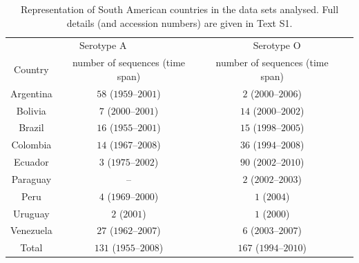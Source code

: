 \documentclass[a4paper,10pt]{article}
\begin{document}
\begin{table}[H]
 \caption{
 Representation of South American countries in the data sets analysed.
 Full details (and accession numbers) are given in Text S1.
 }
 \begin{tabular}{cccc}
 \toprule
   \multicolumn{2}{c}{Serotype A}& \multicolumn{2}{c}{Serotype O}\\
 Country & number of sequences (time span)& number of sequences (time span) & \\ 
  \midrule
Argentina & $58$ ($1959$--$2001$)& $2$ ($2000$--$2006$)  \\
Bolivia   & $7$ ($2000$--$2001$)& $14$ ($2000$--$2002$)  \\
Brazil    & $16$ ($1955$--$2001$)& $15$ ($1998$--$2005$)  \\
Colombia  & $14$ ($1967$--$2008$)& $36$ ($1994$--$2008$)  \\
Ecuador   & $3$ ($1975$--$2002$)& $90$ ($2002$--$2010$)  \\
Paraguay                    & --& $2$ ($2002$--$2003$)  \\
Peru      & $4$ ($1969$--$2000$)& $1$ ($2004$)  \\
Uruguay   & $2$ ($2001$)& $1$ ($2000$)  \\
Venezuela & $27$ ($1962$--$2007$)& $6$ ($2003$--$2007$)  \\
Total     & $131$ ($1955$--$2008$) & $167$ ($1994$--$2010$)\\
  \bottomrule
 \end{tabular}
\label{stab:reps}
\end{table}
\end{document}
